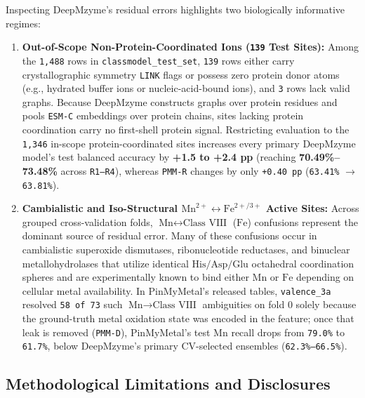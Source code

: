 \documentclass[10pt,a4paper,twocolumn]{article}
\begin{document}
Inspecting DeepMzyme's residual errors highlights two biologically informative regimes:
\begin{enumerate}
  \item \textbf{Out-of-Scope Non-Protein-Coordinated Ions (\texttt{139} Test Sites):} Among the \texttt{1,488} rows in \texttt{classmodel\_test\_set}, \texttt{139} rows either carry crystallographic symmetry \texttt{LINK} flags or possess zero protein donor atoms (e.g., hydrated buffer ions or nucleic-acid-bound ions), and \texttt{3} rows lack valid graphs. Because DeepMzyme constructs graphs over protein residues and pools \texttt{ESM-C} embeddings over protein chains, sites lacking protein coordination carry no first-shell protein signal. Restricting evaluation to the \texttt{1,346} in-scope protein-coordinated sites increases every primary DeepMzyme model's test balanced accuracy by \textbf{+1.5 to +2.4 pp} (reaching \textbf{70.49\%--73.48\%} across \texttt{R1--R4}), whereas \texttt{PMM-R} changes by only \texttt{+0.40 pp} (\texttt{63.41\%} $\to$ \texttt{63.81\%}).
  \item \textbf{Cambialistic and Iso-Structural $\text{Mn}^{2+} \leftrightarrow \text{Fe}^{2+/3+}$ Active Sites:} Across grouped cross-validation folds, $\text{Mn} \leftrightarrow \text{Class VIII}$ ($\text{Fe}$) confusions represent the dominant source of residual error. Many of these confusions occur in cambialistic superoxide dismutases, ribonucleotide reductases, and binuclear metallohydrolases that utilize identical $\text{His/Asp/Glu}$ octahedral coordination spheres and are experimentally known to bind either $\text{Mn}$ or $\text{Fe}$ depending on cellular metal availability. In PinMyMetal's released tables, \texttt{valence\_3a} resolved \texttt{58 of 73} such $\text{Mn} \to \text{Class VIII}$ ambiguities on fold 0 solely because the ground-truth metal oxidation state was encoded in the feature; once that leak is removed (\texttt{PMM-D}), PinMyMetal's test $\text{Mn}$ recall drops from \texttt{79.0\%} to \texttt{61.7\%}, below DeepMzyme's primary CV-selected ensembles (\texttt{62.3\%--66.5\%}).
\end{enumerate}

\subsection{Methodological Limitations and Disclosures}
\end{document}
